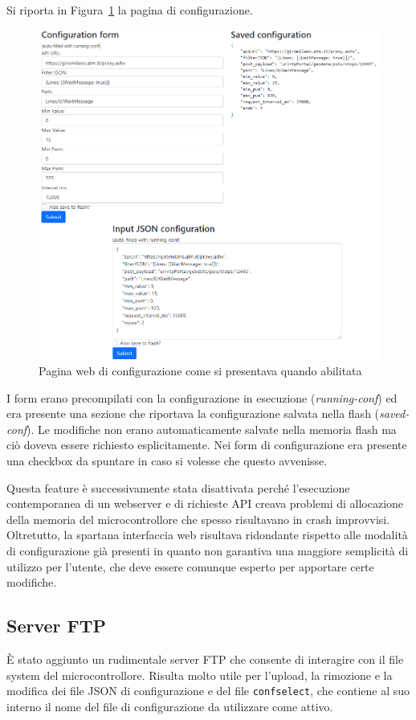 \documentclass[12pt,a4paper]{report}
\begin{document}
Si riporta in Figura~\ref{fig:confwebpage} la pagina di configurazione. 

\begin{figure}[h]
  \centering
  \includegraphics[width=\textwidth]{confwebpage}
  \caption{Pagina web di configurazione come si presentava quando abilitata}
  \label{fig:confwebpage}
\end{figure}

I form erano precompilati con la configurazione in esecuzione (\emph{running-conf}) ed era presente una sezione che riportava la
configurazione salvata nella flash (\emph{saved-conf}).
Le modifiche non erano automaticamente salvate nella memoria flash ma ciò doveva essere richiesto esplicitamente. Nei form di configurazione
era presente una checkbox da spuntare in caso si volesse che questo avvenisse.

Questa feature è successivamente stata disattivata perché l'esecuzione contemporanea di un webserver e di richieste API creava
problemi di allocazione della memoria del microcontrollore che spesso risultavano in crash improvvisi. Oltretutto, la spartana
interfaccia web risultava ridondante rispetto alle modalità di configurazione già presenti in quanto non garantiva una maggiore
semplicità di utilizzo per l'utente, che deve essere comunque esperto per apportare certe modifiche.

\subsection{Server FTP}
È stato aggiunto un rudimentale server FTP che consente di interagire con il file system del microcontrollore. Risulta molto utile per
l'upload, la rimozione e la modifica dei file JSON di configurazione e del file \texttt{confselect}, che contiene al suo interno il nome
del file di configurazione da utilizzare come attivo.
\end{document}
